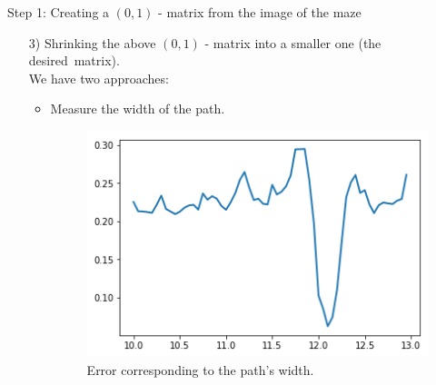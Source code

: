 \documentclass[10pt]{beamer}
\begin{document}
\begin{frame}{Step 1: Creating a $(0, 1)$ - matrix from the image of the maze}
\begin{itemize}
    \item [3)] Shrinking the above $(0,1)$ - matrix into a smaller one (the desired~matrix).\\
    We have two approaches:
    \begin{itemize}
        \item Measure the width of the path.
        \begin{figure}[htb!]
            \centering
            \includegraphics[scale=0.6]{../images/error1.png}
            \caption[]{Error corresponding to the path's width.}
            \label{fig:} %
        \end{figure}
    \end{itemize}
\end{itemize}
\end{frame}
\end{document}
